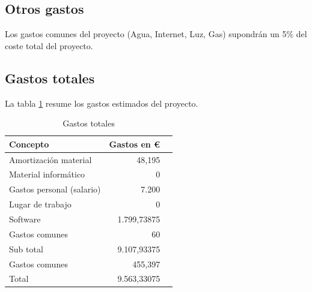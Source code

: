 \subsection{Otros gastos}
Los gastos comunes del proyecto (Agua, Internet, Luz, Gas) supondr\'an un 5\% del coste
total del proyecto.

\subsection{Gastos totales}
La tabla \ref{GastosTotales} resume los gastos estimados del proyecto.
\begin{table}[H]
	\begin{center}
		\begin{tabular}{l*{1}{r}r}
		    Concepto                   & Gastos en € & \\
		    \hline
		    Amortizaci\'on material    & 48,195  & \\
		    Material inform\'atico     & 0 & \\ 
		    Gastos personal (salario)  & 7.200 & \\
		    Lugar de trabajo           & 0 & \\
		    Software                   & 1.799,73875 & \\
		    Gastos comunes             & 60 & \\
		    \hline
		    Sub total				   & 9.107,93375 & \\
		    \hline
		    Gastos comunes			   & 455,397 & \\
		    \hline
		    Total		               & 9.563,33075 &\\
		\end{tabular}
	\caption[Gastos totales]{Gastos totales}
	\label{GastosTotales}
	\end{center}
\end{table}

